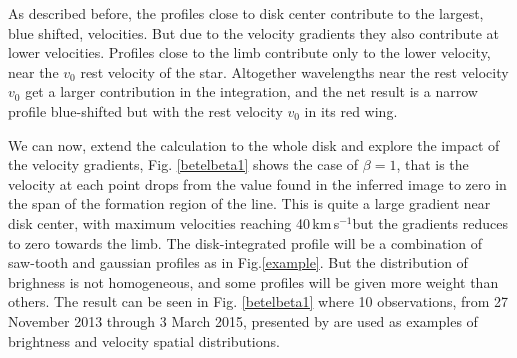 \documentclass{/Users/art2/TeX/aanda/aa}
\def\kms {km\,s$^{-1}$}
\begin{document}
As described before, the profiles close to disk center contribute to the largest, blue shifted, velocities. But due to the velocity gradients they 
also contribute at lower velocities. Profiles close to the limb contribute only to the lower velocity, near the $v_0$ rest velocity of the star. 
Altogether wavelengths near the rest velocity $v_0$ get a larger contribution in the integration, and the net result is a narrow profile blue-shifted but with the rest velocity $v_0$ in its red wing.


We can now, extend the calculation to the whole disk and explore the impact of the velocity gradients, Fig. \ref{betelbeta1} shows the case 
of $\beta=1$, that is the velocity at each point drops from the value found in the inferred image to zero 
in the span of the formation region of the line. This is quite a large gradient near disk center, with maximum velocities reaching 40\,\kms but the gradients reduces to  zero towards the limb. The disk-integrated profile will be a combination of saw-tooth and gaussian 
profiles as in Fig.\ref{example}. But the distribution of brighness is not homogeneous, and some profiles will be given more weight 
than others. The result can be seen in Fig. \ref{betelbeta1} where  10 observations, from 27 November 2013 through 3 March 2015, presented by 
\cite{auriere_discovery_2016} are used as examples of brightness and velocity spatial distributions.
\end{document}
